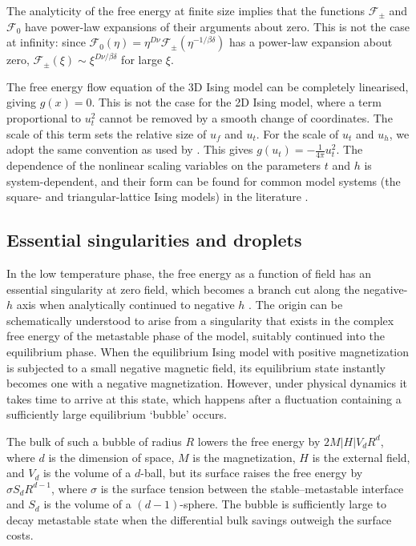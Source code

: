 \documentclass[
  aps,
  pre,
  preprint,
  longbibliography,
  floatfix
]{revtex4-2}
\begin{document}
The analyticity of the free energy at finite size implies that the functions
$\mathcal F_\pm$ and $\mathcal F_0$ have power-law expansions of their
arguments about zero. This is not the case at infinity: since $\mathcal
F_0(\eta)=\eta^{D\nu}\mathcal F_\pm(\eta^{-1/\beta\delta})$ has
a power-law expansion about zero, $\mathcal F_\pm(\xi)\sim
\xi^{D\nu/\beta\delta}$ for large $\xi$.

The free energy flow equation of the 3D Ising model can be completely linearised, giving $g(x)=0$. This is not the case for the 2D Ising model, where a term proportional to $u_t^2$ cannot be removed by a smooth change of coordinates. The scale of this term sets the relative size of $u_f$ and $u_t$.
For the scale of $u_t$ and $u_h$, we adopt the same convention as used by
\cite{Fonseca_2003_Ising}. This gives $g(u_t)=-\frac1{4\pi}u_t^2$. The dependence of the nonlinear scaling variables on
the parameters $t$ and $h$ is system-dependent, and their form can be
found for common model systems (the square- and triangular-lattice Ising
models) in the literature \cite{Clement_2019_Respect}.



\subsection{Essential singularities and droplets}


In the low temperature phase, the free energy as a function of field has an essential singularity at zero field, which becomes a branch cut along the negative-$h$ axis when analytically continued to negative $h$ \cite{Langer_1967_Theory}. The origin can be schematically understood to arise from a
singularity that exists in the complex free energy of the metastable phase of
the model, suitably continued into the equilibrium phase. When the equilibrium
Ising model with positive magnetization is subjected to a small negative
magnetic field, its equilibrium state instantly becomes one with a negative
magnetization. However, under physical dynamics it takes time to arrive at this
state, which happens after a fluctuation containing a sufficiently large
equilibrium `bubble' occurs.

The bulk of such a bubble of radius $R$ lowers the free energy by
$2M|H|V_dR^d$, where $d$ is the dimension of space, $M$ is the magnetization,
$H$ is the external field, and $V_d$ is the volume of a $d$-ball, but its
surface raises the free energy by $\sigma S_dR^{d-1}$, where $\sigma$ is the
surface tension between the stable--metastable interface and $S_d$ is the
volume of a $(d-1)$-sphere. The bubble is sufficiently large to decay
metastable state when the differential bulk savings outweigh the surface costs.
\end{document}
